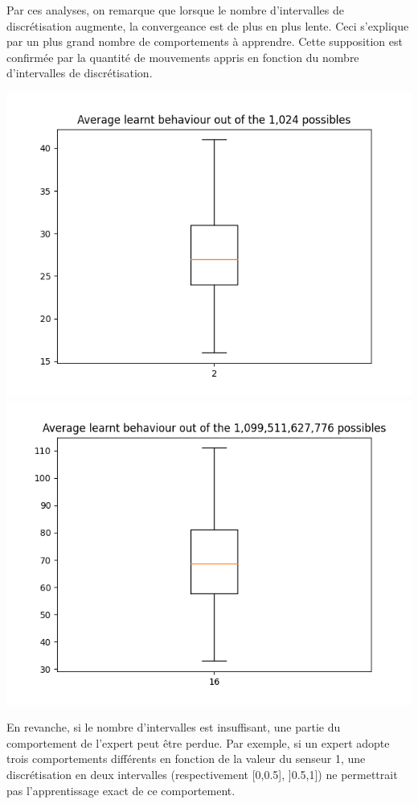 \documentclass[a4paper, 12pt]{report}
\begin{document}
	Par ces analyses, on remarque que lorsque le nombre d'intervalles de discrétisation augmente, la convergeance est de plus en plus lente. Ceci s'explique par un plus grand nombre de comportements à apprendre.
	 Cette supposition est confirmée par la quantité de mouvements appris en fonction du nombre d'intervalles de discrétisation.


\includegraphics[scale = 0.5]{averageLearntBehaviourD2}
\includegraphics[scale = 0.5]{averageLearntBehaviourD16}
	
	En revanche, si le nombre d'intervalles est insuffisant, une partie du comportement de l'expert peut être perdue. Par exemple, si un expert adopte trois comportements différents en fonction de la valeur du senseur 1, une discrétisation en deux intervalles (respectivement [0,0.5], ]0.5,1]) ne permettrait pas l'apprentissage exact de ce comportement.
	
\end{document}
